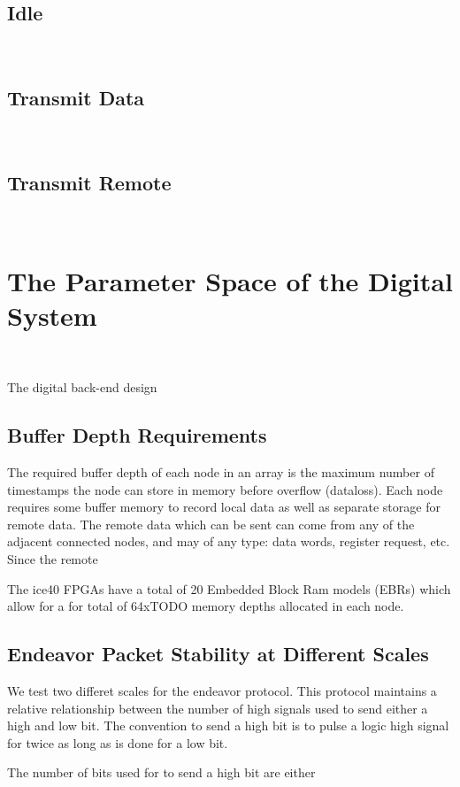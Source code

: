 \subsection{Idle}~\label{sec:state_idle}

\subsection{Transmit Data}~\label{sec:state_data}

\subsection{Transmit Remote}~\label{sec:state_remote}


\section{The Parameter Space of the Digital System}~\label{sec:parameter_space}

The digital back-end design

\subsection{Buffer Depth Requirements}

The required buffer depth of each node in an array is the maximum number of timestamps the node can store in memory before overflow (dataloss).
Each node requires some buffer memory to record local data as well as separate storage for remote data.
The remote data which can be sent can come from any of the adjacent connected nodes, and may of any type: data words, register request, etc.
Since the remote

The ice40 FPGAs have a total of 20 Embedded Block Ram models (EBRs) which allow for a for total of 64xTODO memory depths allocated in each node.

\subsection{Endeavor Packet Stability at Different Scales}

We test two differet scales for the endeavor protocol.
This protocol maintains a relative relationship between the number of high signals used to send either a high and low bit.
The convention to send a high bit is to pulse a logic high signal for twice as long as is done for a low bit.

The number of bits used for to send a high bit are either


